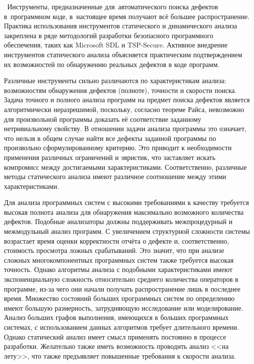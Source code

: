 \actuality\
Инструменты, предназначенные для~автоматического поиска дефектов в~программном коде, в~настоящее время получают всё большее распространение. Практика использования инструментов статического и динамического анализа закреплена в ряде методологий разработки безопасного программного обеспечения, таких как Microsoft SDL и TSP-Secure. Активное внедрение инструментов статического анализа объясняется практическим подтверждением их возможностей по обнаружению реальных дефектов в коде программ. 

Различные инструменты сильно различаются по характеристикам анализа: возможностям обнаружения дефектов (полноте), точности и скорости поиска. Задача точного и полного анализа программ на предмет поиска дефектов является алгоритмически неразрешимой, поскольку, согласно теореме Райса, невозможно для произвольной программы доказать её соответствие заданному нетривиальному свойству. В отношении задачи анализа программы это означает, что нельзя в общем случае найти все дефекты заданной программы по произвольно сформулированному критерию. Это приводит к необходимости применения различных ограничений и эвристик, что заставляет искать компромисс между достигаемыми характеристиками. Соответственно, различные методы статического анализа имеют различное соотношение между этими характеристиками. %


Для анализа программных систем с высокими требованиями к качеству требуется высокая полнота анализа для обнаружения максимально возможного количества дефектов. Подобные анализаторы должны поддерживать межпроцедурный и межмодульный анализ программ. С увеличением структурной сложности системы возрастает время оценки корректности отчёта о дефекте и, соответственно, стоимость просмотра ложных срабатываний. Это значит, что при анализе сложных многокомпонентных программных систем также требуется высокая точность. Однако алгоритмы анализа с подобными характеристиками имеют экспоненциальную сложность относительно среднего количества операторов в программе, из-за чего они начали получать распространение лишь в последнее время. Множество состояний больших программных систем по определению имеют большую размерность, затрудняющую исследование или моделирование. Анализ больших графов выполнения, имеющихся в больших программных системах, с использованием данных алгоритмов требует длительного времени. Однако статический анализ имеет смысл применять постоянно в процессе разработки. Желательно также иметь возможность проводить анализ <<на лету>>, что также предъявляет повышенные требования к скорости анализа.

